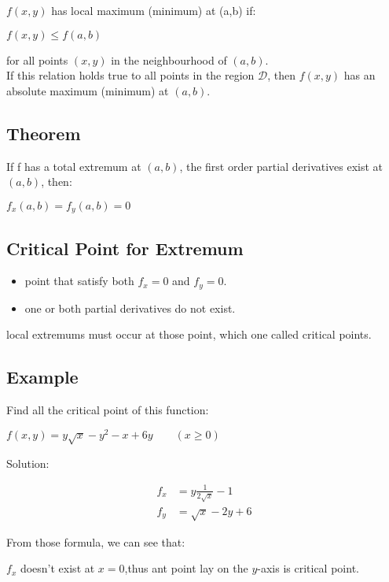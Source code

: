 \documentclass[UTF8,a4paper, 10pt, openany]{svmono}
\begin{document}
$f(x,y)$ has local maximum (minimum) at (a,b) if:

\begin{center}
$f(x,y)\leq f(a,b)$
\end{center}

for all points $(x,y)$ in the neighbourhood of $(a,b)$.\\

If this relation holds true to all points in the region $\mathcal{D}$, then $f(x,y)$ has an absolute maximum (minimum) at $(a,b)$.

\subsection{Theorem}
If f has a total extremum at $(a,b)$, the first order partial derivatives exist at $(a,b)$, then:

\begin{center}
$f_x(a,b)=f_y(a,b)=0$
\end{center}

\subsection{Critical Point for Extremum}
\begin{itemize}
\item point that satisfy both $f_x=0$ and $f_y=0$.
\item one or both partial derivatives do not exist.
\end{itemize}

local extremums must occur at those point, which one called critical points.

\subsection{Example}
Find all the critical point of this function:
\begin{center}
$f(x,y)=y\sqrt{x}-y^2-x+6y\qquad (x\geq 0)$
\end{center}

Solution:

\begin{align*}
f_x &=y\frac{1}{2\sqrt{x}}-1\\
f_y &=\sqrt{x}-2y+6
\end{align*}

From those formula, we can see that:

$f_x$ doesn't exist at $x=0$,thus ant point lay on the $y$-axis is critical point.
\end{document}
